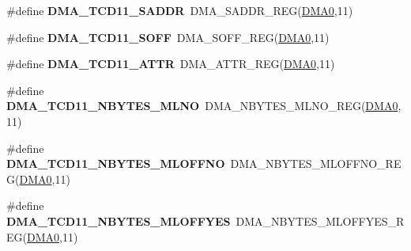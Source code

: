 \begin{DoxyCompactItemize}
\item 
\#define {\bfseries D\+M\+A\+\_\+\+T\+C\+D11\+\_\+\+S\+A\+D\+DR}~D\+M\+A\+\_\+\+S\+A\+D\+D\+R\+\_\+\+R\+EG(\hyperlink{group__DMA__Peripheral__Access__Layer_ga4103044f9ca209772f513dc694513ffb}{D\+M\+A0},11)\hypertarget{group__DMA__Register__Accessor__Macros_gafdcf60dc4fafbaba4ef0aa8078c16b83}{}\label{group__DMA__Register__Accessor__Macros_gafdcf60dc4fafbaba4ef0aa8078c16b83}

\item 
\#define {\bfseries D\+M\+A\+\_\+\+T\+C\+D11\+\_\+\+S\+O\+FF}~D\+M\+A\+\_\+\+S\+O\+F\+F\+\_\+\+R\+EG(\hyperlink{group__DMA__Peripheral__Access__Layer_ga4103044f9ca209772f513dc694513ffb}{D\+M\+A0},11)\hypertarget{group__DMA__Register__Accessor__Macros_ga75ede423859738cb80ae588f482043bb}{}\label{group__DMA__Register__Accessor__Macros_ga75ede423859738cb80ae588f482043bb}

\item 
\#define {\bfseries D\+M\+A\+\_\+\+T\+C\+D11\+\_\+\+A\+T\+TR}~D\+M\+A\+\_\+\+A\+T\+T\+R\+\_\+\+R\+EG(\hyperlink{group__DMA__Peripheral__Access__Layer_ga4103044f9ca209772f513dc694513ffb}{D\+M\+A0},11)\hypertarget{group__DMA__Register__Accessor__Macros_ga4350d724768dbdc84d993c564d3e0c4d}{}\label{group__DMA__Register__Accessor__Macros_ga4350d724768dbdc84d993c564d3e0c4d}

\item 
\#define {\bfseries D\+M\+A\+\_\+\+T\+C\+D11\+\_\+\+N\+B\+Y\+T\+E\+S\+\_\+\+M\+L\+NO}~D\+M\+A\+\_\+\+N\+B\+Y\+T\+E\+S\+\_\+\+M\+L\+N\+O\+\_\+\+R\+EG(\hyperlink{group__DMA__Peripheral__Access__Layer_ga4103044f9ca209772f513dc694513ffb}{D\+M\+A0},11)\hypertarget{group__DMA__Register__Accessor__Macros_ga31e90b84c561b0753b53a9c503e41757}{}\label{group__DMA__Register__Accessor__Macros_ga31e90b84c561b0753b53a9c503e41757}

\item 
\#define {\bfseries D\+M\+A\+\_\+\+T\+C\+D11\+\_\+\+N\+B\+Y\+T\+E\+S\+\_\+\+M\+L\+O\+F\+F\+NO}~D\+M\+A\+\_\+\+N\+B\+Y\+T\+E\+S\+\_\+\+M\+L\+O\+F\+F\+N\+O\+\_\+\+R\+EG(\hyperlink{group__DMA__Peripheral__Access__Layer_ga4103044f9ca209772f513dc694513ffb}{D\+M\+A0},11)\hypertarget{group__DMA__Register__Accessor__Macros_ga1e7eeff6c1ac1ce7329ce41ed9094618}{}\label{group__DMA__Register__Accessor__Macros_ga1e7eeff6c1ac1ce7329ce41ed9094618}

\item 
\#define {\bfseries D\+M\+A\+\_\+\+T\+C\+D11\+\_\+\+N\+B\+Y\+T\+E\+S\+\_\+\+M\+L\+O\+F\+F\+Y\+ES}~D\+M\+A\+\_\+\+N\+B\+Y\+T\+E\+S\+\_\+\+M\+L\+O\+F\+F\+Y\+E\+S\+\_\+\+R\+EG(\hyperlink{group__DMA__Peripheral__Access__Layer_ga4103044f9ca209772f513dc694513ffb}{D\+M\+A0},11)\hypertarget{group__DMA__Register__Accessor__Macros_ga5eb040bb89b2c7e0e133670971a228ef}{}\label{group__DMA__Register__Accessor__Macros_ga5eb040bb89b2c7e0e133670971a228ef}


\end{DoxyCompactItemize}
